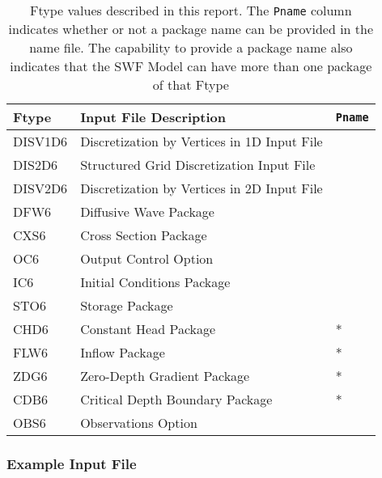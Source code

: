 \begin{table}[H]
\caption{Ftype values described in this report.  The \texttt{Pname} column indicates whether or not a package name can be provided in the name file.  The capability to provide a package name also indicates that the SWF Model can have more than one package of that Ftype}
\small
\begin{center}
\begin{tabular*}{\columnwidth}{l l l}
\hline
\hline
Ftype & Input File Description & \texttt{Pname}\\
\hline
DISV1D6 & Discretization by Vertices in 1D Input File \\
DIS2D6 & Structured Grid Discretization Input File \\
DISV2D6 & Discretization by Vertices in 2D Input File \\
DFW6 & Diffusive Wave Package \\ 
CXS6 & Cross Section Package \\ 
OC6 & Output Control Option \\
IC6 & Initial Conditions Package \\
STO6 & Storage Package \\
CHD6 & Constant Head Package & * \\ 
FLW6 & Inflow Package & * \\ 
ZDG6 & Zero-Depth Gradient Package & * \\ 
CDB6 & Critical Depth Boundary Package & * \\ 
OBS6 & Observations Option \\
\hline 
\end{tabular*}
\label{table:ftype-swf}
\end{center}
\normalsize
\end{table}

\vspace{5mm}
\subsubsection{Example Input File}


